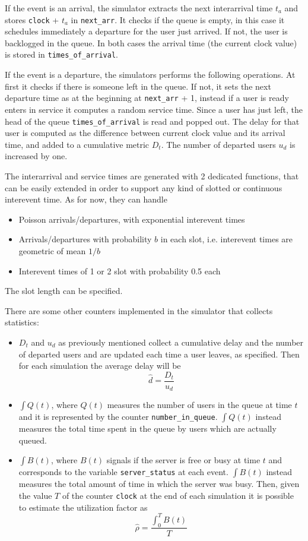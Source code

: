 \documentclass[10pt]{article}
\begin{document}
If the event is an arrival, the simulator extracts the next interarrival time $t_a$ and stores \texttt{clock} + $t_a$ in \texttt{next\_arr}. It checks if the queue is empty, in this case it schedules immediately a departure for the user just arrived. If not, the user is backlogged in the queue. In both cases the arrival time (the current clock value) is stored in \texttt{times\_of\_arrival}.

If the event is a departure, the simulators performs the following operations. At first it checks if there is someone left in the queue. If not, it sets the next departure time as at the beginning at \texttt{next\_arr} + 1, instead if a user is ready enters in service it computes a random service time. Since a user has just left, the head of the queue \texttt{times\_of\_arrival} is read and popped out. The delay for that user is computed as the difference between current clock value and its arrival time, and added to a cumulative metric $D_t$. The number of departed users $u_d$ is increased by one. 

The interarrival and service times are generated with 2 dedicated functions, that can be easily extended in order to support any kind of slotted or continuous interevent time. As for now, they can handle 
\begin{itemize}
\item Poisson arrivals/departures, with exponential interevent times 
\item Arrivals/departures with probability $b$ in each slot, i.e. interevent times are geometric of mean $1/b$
\item Interevent times of 1 or 2 slot with probability 0.5 each
\end{itemize}
The slot length can be specified.

There are some other counters implemented in the simulator that collects statistics:

\begin{itemize}
\item $D_t$ and $u_d$ as previously mentioned collect a cumulative delay and the number of departed users and are updated each time a user leaves, as specified. Then for each simulation the average delay will be
\begin{equation}
	\hat{d} = \frac{D_t}{u_d}
\end{equation}
\item $\int Q(t)$, where $Q(t)$ measures the number of users in the queue at time $t$ and it is represented by the counter \texttt{number\_in\_queue}. $\int Q(t)$ instead measures the total time spent in the queue by users which are actually queued. 
\item $\int B(t)$, where $B(t)$ signals if the server is free or busy at time $t$ and corresponds to the variable \texttt{server\_status} at each event. $\int B(t)$ instead measures the total amount of time in which the server was busy. Then, given the value $T$ of the counter \texttt{clock} at the end of each simulation it is possible to estimate the utilization factor as 
\begin{equation}
	\hat{\rho} = \frac{\int_0^T B(t)}{T}
	\label{eq:rho}
\end{equation}
\end{itemize}
\end{document}
